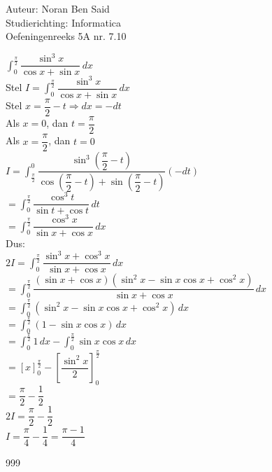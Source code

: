 \documentclass[a4paper]{article}
\begin{document}
  
\noindent \large Auteur: Noran Ben Said \\
\noindent \large Studierichting: Informatica\\
\noindent \large Oefeningenreeks 5A nr. 7.10 \\
\medskip

\normalsize

$ \displaystyle\int_0^{\tfrac{\pi}{2}} \dfrac{\sin^3 x}{\cos x + \sin x}\,dx$\\

Stel $ I = \displaystyle\int_0^{\tfrac{\pi}{2}} \dfrac{\sin^3 x}{\cos x + \sin x}\,dx$\\

Stel $ x = \dfrac{\pi}{2} - t \Rightarrow dx = -dt$\\

Als $x=0$, dan $t=\dfrac{\pi}{2}$\\

Als $x=\dfrac{\pi}{2}$, dan $t=0$\\

$ I = \displaystyle\int_{\tfrac{\pi}{2}}^0 \dfrac{\sin^3\left(\dfrac{\pi}{2}-t\right)}{\cos\left(\dfrac{\pi}{2}-t\right)+\sin\left(\dfrac{\pi}{2}-t\right)}(-dt)$\\

$ = \displaystyle\int_0^{\tfrac{\pi}{2}} \dfrac{\cos^3 t}{\sin t + \cos t}\,dt$\\

$ = \displaystyle\int_0^{\tfrac{\pi}{2}} \dfrac{\cos^3 x}{\sin x + \cos x}\,dx$\\

Dus:\\

$ 2I = \displaystyle\int_0^{\tfrac{\pi}{2}} \dfrac{\sin^3 x + \cos^3 x}{\sin x + \cos x}\,dx$\\

$ = \displaystyle\int_0^{\tfrac{\pi}{2}} \dfrac{(\sin x + \cos x)(\sin^2 x - \sin x \cos x + \cos^2 x)}{\sin x + \cos x}\,dx$\\

$ = \displaystyle\int_0^{\tfrac{\pi}{2}} (\sin^2 x - \sin x \cos x + \cos^2 x)\,dx$\\

$ = \displaystyle\int_0^{\tfrac{\pi}{2}} (1 - \sin x \cos x)\,dx$\\

$ = \displaystyle\int_0^{\tfrac{\pi}{2}} 1\,dx - \int_0^{\frac{\pi}{2}} \sin x \cos x\,dx$\\

$ = \left[x\right]_0^{\tfrac{\pi}{2}} - \left[\dfrac{\sin^2 x}{2}\right]_0^{\tfrac{\pi}{2}}$\\

$ = \dfrac{\pi}{2} - \dfrac{1}{2}$\\

$ 2I = \dfrac{\pi}{2} - \dfrac{1}{2}$\\

$ I = \dfrac{\pi}{4} - \dfrac{1}{4} = \dfrac{\pi - 1}{4}$\\


\begin{thebibliography}{999}
\end{thebibliography}
\end{document}

